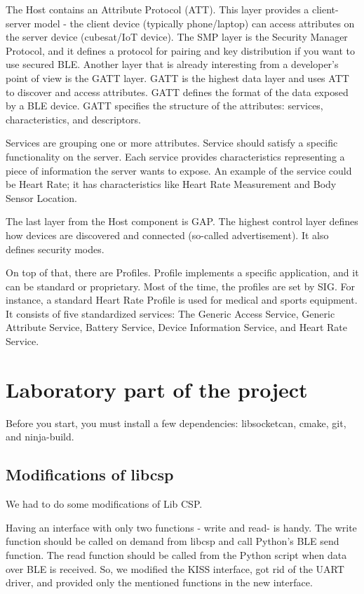 \documentclass[conference]{IEEEtran}
\begin{document}
The Host contains an Attribute Protocol (ATT). This layer provides a client-server model - the client device (typically phone/laptop) can access attributes on the server device (cubesat/IoT device). The SMP layer is the Security Manager Protocol, and it defines a protocol for pairing and key distribution if you want to use secured BLE.
Another layer that is already interesting from a developer's point of view is the GATT layer. GATT is the highest data layer and uses ATT to discover and access attributes. GATT defines the format of the data exposed by a BLE device. GATT specifies the structure of the attributes: services, characteristics, and descriptors.

Services are grouping one or more attributes. Service should satisfy a specific functionality on the server. Each service provides characteristics representing a piece of information the server wants to expose. An example of the service could be Heart Rate; it has characteristics like Heart Rate Measurement and Body Sensor Location.

The last layer from the Host component is GAP. The highest control layer defines how devices are discovered and connected (so-called advertisement). It also defines security modes.

On top of that, there are Profiles. Profile implements a specific application, and it can be standard or proprietary. Most of the time, the profiles are set by SIG. For instance, a standard Heart Rate Profile is used for medical and sports equipment. It consists of five standardized services: The Generic Access Service, Generic Attribute Service, Battery Service, Device Information Service, and Heart Rate Service. \cite{embeddedcentric}

\section{Laboratory part of the project}
Before you start, you must install a few dependencies: libsocketcan, cmake, git, and ninja-build.
\subsection{Modifications of libcsp}
We had to do some modifications of Lib CSP.

Having an interface with only two functions - write and read- is handy. The write function should be called on demand from libcsp and call Python's BLE send function. The read function should be called from the Python script when data over BLE is received. So, we modified the KISS interface, got rid of the UART driver, and provided only the mentioned functions in the new interface.
 
\end{document}
